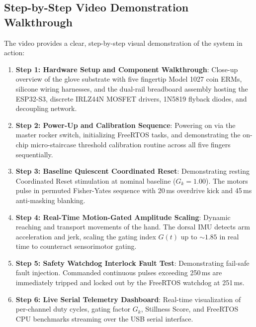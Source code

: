 \documentclass[10pt,twocolumn]{article}
\begin{document}
\begin{center}
\end{center}

\subsection{Step-by-Step Video Demonstration Walkthrough}
The video provides a clear, step-by-step visual demonstration of the system in action:
\begin{enumerate}
    \item \textbf{Step 1: Hardware Setup and Component Walkthrough}: Close-up overview of the glove substrate with five fingertip Model 1027 coin ERMs, silicone wiring harnesses, and the dual-rail breadboard assembly hosting the ESP32-S3, discrete IRLZ44N MOSFET drivers, 1N5819 flyback diodes, and decoupling network.
    \item \textbf{Step 2: Power-Up and Calibration Sequence}: Powering on via the master rocker switch, initializing FreeRTOS tasks, and demonstrating the on-chip micro-staircase threshold calibration routine across all five fingers sequentially.
    \item \textbf{Step 3: Baseline Quiescent Coordinated Reset}: Demonstrating resting Coordinated Reset stimulation at nominal baseline ($G_k = 1.00$). The motors pulse in permuted Fisher-Yates sequence with 20\,ms overdrive kick and 45\,ms anti-masking blanking.
    \item \textbf{Step 4: Real-Time Motion-Gated Amplitude Scaling}: Dynamic reaching and transport movements of the hand. The dorsal IMU detects arm acceleration and jerk, scaling the gating index $G(t)$ up to $\sim 1.85$ in real time to counteract sensorimotor gating.
    \item \textbf{Step 5: Safety Watchdog Interlock Fault Test}: Demonstrating fail-safe fault injection. Commanded continuous pulses exceeding 250\,ms are immediately tripped and locked out by the FreeRTOS watchdog at 251\,ms.
    \item \textbf{Step 6: Live Serial Telemetry Dashboard}: Real-time visualization of per-channel duty cycles, gating factor $G_k$, Stillness Score, and FreeRTOS CPU benchmarks streaming over the USB serial interface.
\end{enumerate}
\end{document}
